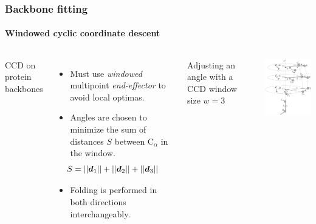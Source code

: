\documentclass{beamer}
\renewcommand\v[1]{\boldsymbol{#1}}
\begin{document}
\begin{frame}[t, fragile]
\frametitle{Backbone fitting} 
\framesubtitle{Windowed cyclic coordinate descent}


\begin{columns}[c]
\column{2.4in}
CCD on protein backbones
\vspace*{3mm}
\begin{itemize}
\item Must use \emph{windowed} multipoint \emph{end-effector} to avoid local optimas.

\item Angles are chosen to minimize the sum of distances $S$ between C$_\alpha$ in the window.
$$\hspace*{-8mm}S=||\v{d}_1||+||\v{d}_2||+||\v{d}_3||$$

\item Folding is performed in both directions interchangeably.
\end{itemize}


\hspace*{4.3cm}
\parbox{4cm}{
\begin{flushleft}
\footnotesize{
Adjusting an angle with a 
CCD window size $w=3$
}
\end{flushleft}
}

\column{2.2in}
\begin{center}
\vspace*{-6mm}
\hspace*{-4mm}
\includegraphics[width=2.3in]{ccd}
\end{center}

\end{columns}
\end{frame}
\end{document}

